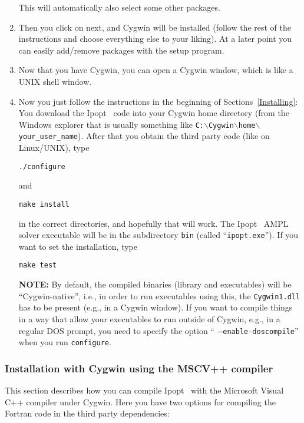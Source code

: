 \documentclass[10pt]{article}
\newcommand{\Ipopt}{{\sc Ipopt }}
\begin{document}
\begin{enumerate}
  This will automatically also select some other packages.
\item\label{it:cyg_done} Then you click on next, and Cygwin will be
  installed (follow the rest of the instructions and choose everything
  else to your liking).  At a later point you can easily add/remove
  packages with the setup program.

\item Now that you have Cygwin, you can open a Cygwin window, which is
  like a UNIX shell window.

\item\label{it:cyg_inst} Now you just follow the instructions in the
  beginning of Sections~\ref{Installing}: You download the \Ipopt\
  code into your Cygwin home directory (from the Windows explorer that
  is usually something like
  \texttt{C:$\backslash$Cygwin$\backslash$home$\backslash$your\_user\_name}).
  After that you obtain the third party code (like on Linux/UNIX),
  type

  \texttt{./configure}

  and

  \texttt{make install}

  in the correct directories, and hopefully that will work.  The
  \Ipopt\ AMPL solver executable will be in the subdirectory
  \texttt{bin} (called ``\texttt{ipopt.exe}'').  If you want to set
  the installation, type

  \texttt{make test}

  \textbf{NOTE:} By default, the compiled binaries (library and
  executables) will be ``Cygwin-native'', i.e., in order to run
  executables using this, the {\tt Cygwin1.dll} has to be present
  (e.g., in a Cygwin window).  If you want to compile things in a way
  that allow your executables to run outside of Cygwin, e.g., in a
  regular DOS prompt, you need to specify the option ``{\tt
    --enable-doscompile}'' when you run {\tt configure}.
\end{enumerate}

\subsubsection{Installation with Cygwin using the MSCV++ compiler}
\label{CygwinInstallNative}

This section describes how you can compile \Ipopt\ with the Microsoft
Visual C++ compiler under Cygwin.  Here you have two options for
compiling the Fortran code in the third party dependencies:
\end{document}
